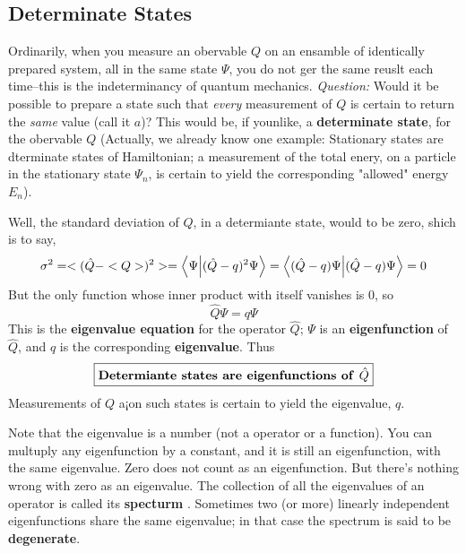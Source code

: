 \subsection{Determinate States}
Ordinarily, when you measure an obervable $Q$ on an ensamble of identically prepared system, all in the same state $\Psi$, you do not ger the same reuslt each time--this is the indeterminancy of quantum mechanics. \textit{Question:} Would it be possible to prepare a state such that \textit{every} measurement of $Q$ is certain to return the \textit{same} value (call it $a$)? This would be, if younlike, a \textbf{determinate state}, for the obervable $Q$ (Actually, we already know one example: Stationary states are dterminate states of Hamiltonian; a measurement of the total enery, on a particle in the stationary state $\Psi_n$, is certain to yield the corresponding "allowed" energy $E_n$).

Well, the standard deviation of $Q$, in a determiante state, would to be zero, shich is to say,
\begin{equation}\label{3.21}
	\sigma^2=<(\hat{Q}-<Q>)^2>=\bra{\Psi}\ket{(\hat{Q}-q)^2\Psi}=\bra{(\hat{Q}-q)\Psi}\ket{(\hat{Q}-q)\Psi}=0
\end{equation}
But the only function whose inner product with itself vanishes is $0$, so
\begin{equation}\label{3.22}
	\hat{Q}\Psi=q\Psi
\end{equation}
This is the \textbf{eigenvalue equation} for the operator $\hat{Q}$; $\Psi$ is an \textbf{eigenfunction} of $\hat{Q}$, and $q$ is the corresponding \textbf{eigenvalue}. Thus
\begin{equation}\label{3.23}
	\boxed{\mbox{\textbf{Determiante states are eigenfunctions of }$\hat{Q}$}}
\end{equation}
Measurements of $Q$ a¡on such states is certain to yield the eigenvalue, $q$.

Note that the eigenvalue is a number (not a operator or a function). You can multuply any eigenfunction by a constant,  and it is still an eigenfunction, with the same eigenvalue. Zero does not count as an eigenfunction. But there's nothing wrong with zero as an eigenvalue. The collection of all the eigenvalues of an operator is called its \textbf{specturm} . Sometimes two (or more) linearly independent eigenfunctions share the same eigenvalue; in that case the spectrum is said to be \textbf{degenerate}.

